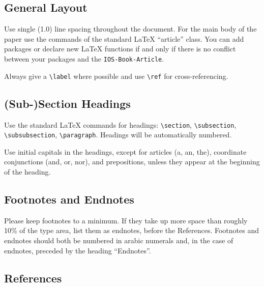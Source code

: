 \documentclass{IOS-Book-Article}
\begin{document}
\subsection{General Layout}
Use single (1.0) line spacing throughout the document. For the main
body of the paper use the commands of the standard \LaTeX{}
``article'' class. You can add packages or declare new \LaTeX{}
functions if and only if there is no conflict between your packages
and the \texttt{IOS-Book-Article}.

Always give a \verb|\label| where possible and use \verb|\ref| for cross-referencing.


\subsection{(Sub-)Section Headings}
Use the standard \LaTeX{} commands for headings: {\small \verb|\section|, \verb|\subsection|, \verb|\subsubsection|, \verb|\paragraph|}.
Headings will be automatically numbered.

Use initial capitals in the headings, except for articles (a, an, the), coordinate
conjunctions (and, or, nor), and prepositions, unless they appear at the beginning
of the heading.

\subsection{Footnotes and Endnotes}
Please keep footnotes to a minimum. If they take up more space than roughly 10\% of
the type area, list them as endnotes, before the References. Footnotes and endnotes
should both be numbered in arabic numerals and, in the case of endnotes, preceded by
the heading ``Endnotes''.

\subsection{References}
\end{document}
